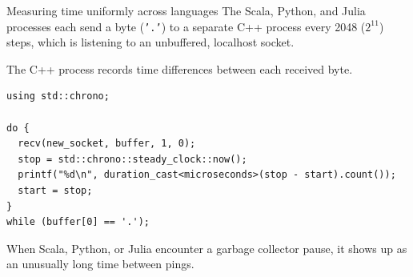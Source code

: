 \documentclass[aspectratio=169]{beamer}
\begin{document}
\begin{frame}[fragile]{Measuring time uniformly across languages}
\vspace{0.3 cm}
The Scala, Python, and Julia processes each send a byte (\texttt{'.'}) to a separate C++ process every 2048 ($2^{11}$) steps, which is listening to an unbuffered, localhost socket.

\vspace{0.2 cm}
The C++ process records time differences between each received byte.

\small
\vspace{0.3 cm}
\begin{verbatim}
using std::chrono;

do {
  recv(new_socket, buffer, 1, 0);
  stop = std::chrono::steady_clock::now();
  printf("%d\n", duration_cast<microseconds>(stop - start).count());
  start = stop;
}
while (buffer[0] == '.');
\end{verbatim}

\normalsize
\vspace{0.3 cm}
When Scala, Python, or Julia encounter a garbage collector pause, it shows up as an unusually long time between pings.
\end{frame}
\end{document}

